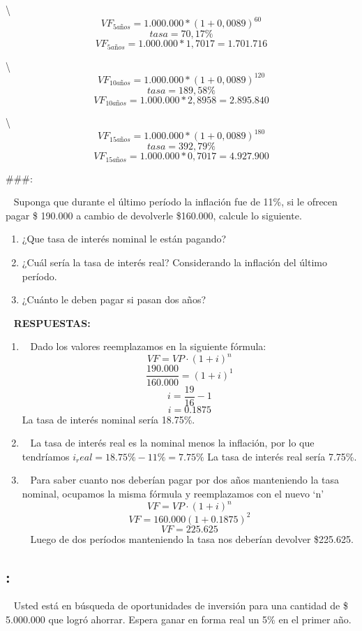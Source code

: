 \documentclass[
  letterpaper,
  DIV=11,
  numbers=noendperiod]{scrreport}
\begin{document}
\textbackslash{} \[VF_{5años}=1.000.000*(1+0,0089)^{60}\]
\[tasa=70,17\%\] \[{VF}_{5años} = 1.000.000*1,7017=1.701.716\]

\textbackslash{} \[VF_{10años}=1.000.000*(1+0,0089)^{120}\]
\[tasa=189,58\%\] \[{VF}_{10años} = 1.000.000*2,8958=2.895.840\]

\textbackslash{} \[VF_{15años}=1.000.000*(1+0,0089)^{180}\]
\[tasa=392,79\%\] \[{VF}_{15años} = 1.000.000*0,7017=4.927.900\]

\#\#\#:

~ Suponga que durante el último período la inflación fue de 11\%, si le
ofrecen pagar \$ 190.000 a cambio de devolverle \$160.000, calcule lo
siguiente.

\begin{enumerate}
\def\labelenumi{\alph{enumi})}
\item
  ¿Que tasa de interés nominal le están pagando?
\item
  ¿Cuál sería la tasa de interés real? Considerando la inflación del
  último período.
\item
  ¿Cuánto le deben pagar si pasan dos años?
\end{enumerate}

~ \textbf{RESPUESTAS:}

\begin{enumerate}
\def\labelenumi{\alph{enumi})}
\item
  ~ Dado los valores reemplazamos en la siguiente fórmula:
  \[VF=VP \cdot (1+i)^n\] \[\frac{190.000}{160.000} = (1+i)^1\]
  \[i=\frac{19}{16} - 1\] \[i = 0.1875\] La tasa de interés nominal
  sería 18.75\%.
\item
  ~ La tasa de interés real es la nominal menos la inflación, por lo que
  tendríamos \(i_real = 18.75\% - 11\% = 7.75\%\) La tasa de interés
  real sería 7.75\%.
\item
  ~ Para saber cuanto nos deberían pagar por dos años manteniendo la
  tasa nominal, ocupamos la misma fórmula y reemplazamos con el nuevo
  `n' \[VF=VP \cdot (1+i)^n\] \[VF = 160.000(1+0.1875)^2\]
  \[VF = 225.625\] ~ Luego de dos períodos manteniendo la tasa nos
  deberían devolver \$225.625.
\end{enumerate}

\hypertarget{section-40}{%
\subsection{:}\label{section-40}}

~ Usted está en búsqueda de oportunidades de inversión para una cantidad
de \$ 5.000.000 que logró ahorrar. Espera ganar en forma real un 5\% en
el primer año.
\end{document}
